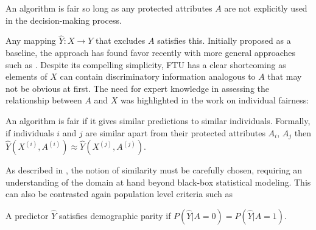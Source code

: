
\begin{define}
  An algorithm is fair so long as any protected attributes $A$ are not
  explicitly used in the decision-making process. 
\end{define}
Any mapping $\hat{Y}: X \rightarrow Y$ that excludes $A$ satisfies
this. Initially proposed as a baseline, the approach has found
favor recently with more general approaches such as \citet{grgiccase}.
Despite its compelling simplicity, FTU has a clear
shortcoming as elements of $X$ can contain discriminatory information
analogous to $A$ that may not be obvious at first. The need for expert
knowledge in assessing the relationship between $A$ and $X$ was
highlighted in the work on individual fairness:
%
\begin{define}
  An algorithm is fair if it gives similar predictions to similar
  individuals. Formally, if individuals $i$ and $j$ are similar apart
  from their protected attributes $A_i$, $A_j$ then
  $\hat{Y}(X^{(i)}, A^{(i)}) \approx \hat{Y}(X^{(j)}, A^{(j)})$.
\end{define}
As described in \cite{dwork2012fairness}, the notion of similarity
must be carefully chosen, requiring an understanding of the domain at
hand beyond black-box statistical modeling. This can also be
contrasted again population level criteria such as
%
\begin{define} 
A predictor  $\hat{Y}$ satisfies demographic parity if
$P(\hat{Y} | A = 0) = P(\hat{Y} | A = 1)$. %
\end{define}
